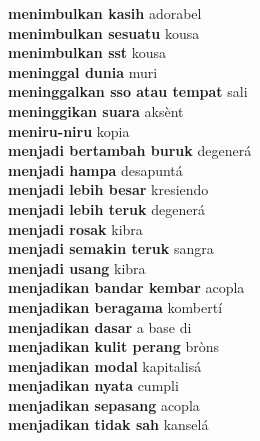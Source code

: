 \textbf{ menimbulkan kasih  } adorabel \\
\textbf{ menimbulkan sesuatu  } kousa \\
\textbf{ menimbulkan sst  } kousa \\
\textbf{ meninggal dunia  } muri \\
\textbf{ meninggalkan sso atau tempat  } sali \\
\textbf{ meninggikan suara  } aksènt \\
\textbf{ meniru-niru  } kopia \\
\textbf{ menjadi bertambah buruk  } degenerá \\
\textbf{ menjadi hampa  } desapuntá \\
\textbf{ menjadi lebih besar  } kresiendo \\
\textbf{ menjadi lebih teruk  } degenerá \\
\textbf{ menjadi rosak  } kibra \\
\textbf{ menjadi semakin teruk  } sangra \\
\textbf{ menjadi usang  } kibra \\
\textbf{ menjadikan bandar kembar  } acopla \\
\textbf{ menjadikan beragama  } kombertí \\
\textbf{ menjadikan dasar  } a base di \\
\textbf{ menjadikan kulit perang  } bròns \\
\textbf{ menjadikan modal  } kapitalisá \\
\textbf{ menjadikan nyata  } cumpli \\
\textbf{ menjadikan sepasang  } acopla \\
\textbf{ menjadikan tidak sah  } kanselá \\
